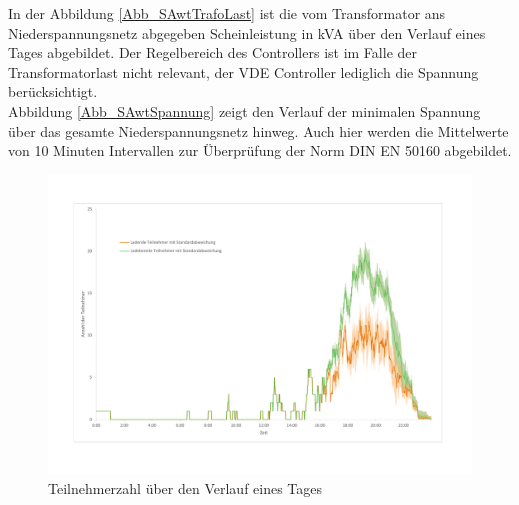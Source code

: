In der Abbildung \ref{Abb_SAwtTrafoLast} ist die vom Transformator ans Niederspannungsnetz abgegeben Scheinleistung in kVA über den Verlauf eines Tages abgebildet. Der Regelbereich des Controllers ist im Falle der Transformatorlast nicht relevant, der VDE Controller lediglich die Spannung berücksichtigt.\\
Abbildung \ref{Abb_SAwtSpannung} zeigt den Verlauf der minimalen Spannung über das gesamte Niederspannungsnetz hinweg. Auch hier werden die Mittelwerte von 10 Minuten Intervallen zur Überprüfung der Norm DIN EN 50160 abgebildet.
\begin{figure}[htb]
\centering
	\includegraphics[scale=0.5]{img/SA_wT/Teilnehmer2.pdf}
	\caption{Teilnehmerzahl über den Verlauf eines Tages}
	\label{Abb_SAwtTeilnehmer}
\end{figure}

